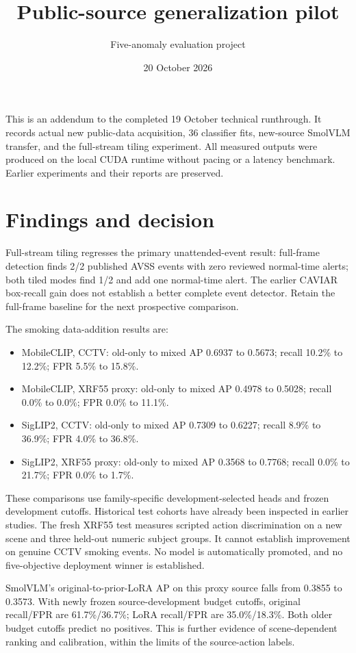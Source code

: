 \documentclass[10pt,a4paper]{article}
\title{Public-source generalization pilot}
\author{Five-anomaly evaluation project}
\date{20 October 2026}
\begin{document}
\maketitle\tableofcontents\newpage

This is an addendum to the completed 19 October technical runthrough. It records actual new public-data acquisition, 36 classifier fits, new-source SmolVLM transfer, and the full-stream tiling experiment. All measured outputs were produced on the local CUDA runtime without pacing or a latency benchmark. Earlier experiments and their reports are preserved.

\section{Findings and decision}

Full-stream tiling regresses the primary unattended-event result: full-frame detection finds 2/2 published AVSS events with zero reviewed normal-time alerts; both tiled modes find 1/2 and add one normal-time alert. The earlier CAVIAR box-recall gain does not establish a better complete event detector. Retain the full-frame baseline for the next prospective comparison.

The smoking data-addition results are:

\begin{itemize}
\item MobileCLIP, CCTV: old-only to mixed AP 0.6937 to 0.5673; recall 10.2\% to 12.2\%; FPR 5.5\% to 15.8\%.
\item MobileCLIP, XRF55 proxy: old-only to mixed AP 0.4978 to 0.5028; recall 0.0\% to 0.0\%; FPR 0.0\% to 11.1\%.
\item SigLIP2, CCTV: old-only to mixed AP 0.7309 to 0.6227; recall 8.9\% to 36.9\%; FPR 4.0\% to 36.8\%.
\item SigLIP2, XRF55 proxy: old-only to mixed AP 0.3568 to 0.7768; recall 0.0\% to 21.7\%; FPR 0.0\% to 1.7\%.
\end{itemize}
These comparisons use family-specific development-selected heads and frozen development cutoffs. Historical test cohorts have already been inspected in earlier studies. The fresh XRF55 test measures scripted action discrimination on a new scene and three held-out numeric subject groups. It cannot establish improvement on genuine CCTV smoking events. No model is automatically promoted, and no five-objective deployment winner is established.

SmolVLM's original-to-prior-LoRA AP on this proxy source falls from 0.3855 to 0.3573. With newly frozen source-development budget cutoffs, original recall/FPR are 61.7\%/36.7\%; LoRA recall/FPR are 35.0\%/18.3\%. Both older budget cutoffs predict no positives. This is further evidence of scene-dependent ranking and calibration, within the limits of the source-action labels.
\end{document}

